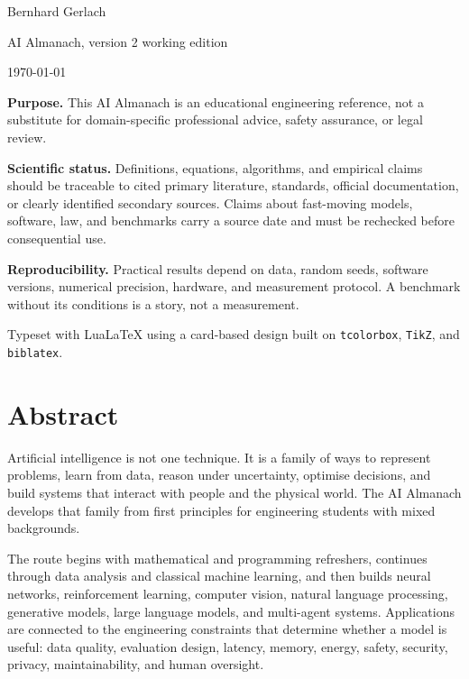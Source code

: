 \begin{titlepage}
    {\sffamily\Large Bernhard Gerlach\par}
    \vspace{0.25cm}
    {\sffamily\large AI Almanach, version 2 working edition\par}
    {\sffamily\normalsize \today\par}
\end{titlepage}

\clearpage
\thispagestyle{empty}
\vspace*{\fill}
{\sffamily\small
\textbf{Purpose.}
This AI Almanach is an educational engineering reference, not a substitute for
domain-specific professional advice, safety assurance, or legal review.

\medskip
\textbf{Scientific status.}
Definitions, equations, algorithms, and empirical claims should be traceable
to cited primary literature, standards, official documentation, or clearly
identified secondary sources.
Claims about fast-moving models, software, law, and benchmarks carry a source
date and must be rechecked before consequential use.

\medskip
\textbf{Reproducibility.}
Practical results depend on data, random seeds, software versions, numerical
precision, hardware, and measurement protocol.
A benchmark without its conditions is a story, not a measurement.

\medskip
Typeset with LuaLaTeX using a card-based design built on \texttt{tcolorbox},
\texttt{TikZ}, and \texttt{biblatex}.
}
\vspace*{\fill}
\clearpage

\chapter*{Abstract}

Artificial intelligence is not one technique.
It is a family of ways to represent problems, learn from data, reason under
uncertainty, optimise decisions, and build systems that interact with people
and the physical world.
The AI Almanach develops that family from first principles for engineering
students with mixed backgrounds.

The route begins with mathematical and programming refreshers, continues
through data analysis and classical machine learning, and then builds neural
networks, reinforcement learning, computer vision, natural language
processing, generative models, large language models, and multi-agent systems.
Applications are connected to the engineering constraints that determine
whether a model is useful: data quality, evaluation design, latency, memory,
energy, safety, security, privacy, maintainability, and human oversight.

